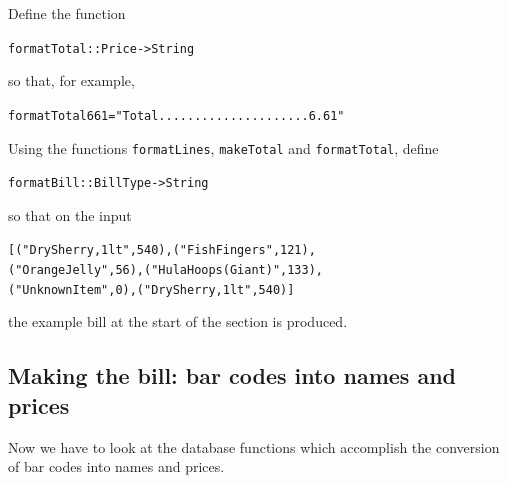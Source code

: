 \begin{exercises}
\item
Define the function
\begin{alltt}
formatTotal :: Price -> String
\end{alltt}
so that, for example,
\begin{alltt}
formatTotal 661 = "Total.....................6.61"
\end{alltt}

\item
Using the functions \texttt{formatLines}, \texttt{makeTotal} and \texttt{formatTotal},
define 
\begin{alltt}
formatBill :: BillType -> String
\end{alltt} 
so that on the input
\begin{alltt}
[("Dry Sherry, 1lt",540),("Fish Fingers",121),
("Orange Jelly",56),("Hula Hoops (Giant)",133),
("Unknown Item",0),("Dry Sherry, 1lt",540)]
\end{alltt}
the example bill at the start of the section is produced.

\end{exercises}
\subsection*{Making the bill: bar codes into names and prices}

Now we have to look
at the database functions which accomplish the conversion of bar codes into 
names and prices.

